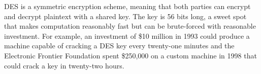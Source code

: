 \documentclass[12pt]{turabian-researchpaper}
\begin{document}
DES is a symmetric encryption scheme, meaning that both parties can encrypt and decrypt plaintext with a shared key.
The key is 56 bits long, a sweet spot that makes computation reasonably fast but can be brute-forced with reasonable investment.
For example, an investment of \$10 million in 1993 could produce a machine capable of cracking a DES key every twenty-one minutes and the Electronic Frontier Foundation spent \$250,000 on a custom machine in 1998 that could crack a key in twenty-two hours.



\pagebreak

\theendnotes

\printbibliography
\end{document}
